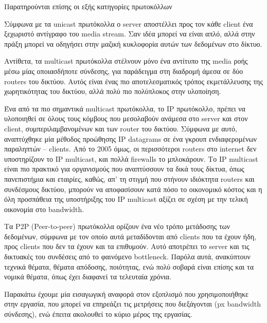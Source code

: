 \documentclass{article}
\begin{document}
Παρατηρούνται επίσης οι εξής κατηγορίες πρωτοκόλλων

Σύμφωνα με τα unicast πρωτόκολλα ο server αποστέλλει προς τον κάθε client ένα ξεχωριστό αντίγραφο του media stream.
Σαν ιδέα μπορεί να είναι απλό, αλλά στην πράξη μπορεί να οδηγήσει στην μαζική κυκλοφορία αυτών των δεδομένων στο δίκτυο.

Αντίθετα, τα multicast πρωτόκολλα στέλνουν μόνο ένα αντίτυπο της media ροής μέσω μίας οποιασδήποτε σύνδεσης, για παράδειγμα στη διαδρομή άμεσα σε δύο routers του δικτύου.
Αυτός είναι ένας πιο αποτελεσματικός τρόπος εκμετάλλευσης της χωρητικότητας του δικτύου, αλλά πολύ πιο πολύπλοκος στην υλοποίηση.

Ένα από τα πιο σημαντικά multicast πρωτόκολλα, το IP πρωτόκολλο, πρέπει να υλοποιηθεί σε όλους τους κόμβους που μεσολαβούν ανάμεσα στο server και στον client, συμπεριλαμβανομένων και των router του δικτύου.
Σύμφωνα με αυτό, αναπτύχθηκε μία μέθοδος προώθησης IP datagrams σε ένα γκρουπ ενδιαφερομένων παραληπτών – clients.
Από το 2005 όμως, οι περισσότεροι routers στο internet δεν υποστηρίζουν το IP multicast, και πολλά firewalls το μπλοκάρουν.
Το IP multicast είναι πιο πρακτικό για οργανισμούς που αναπτύσσουν τα δικά τους δίκτυα, όπως πανεπιστήμια και εταιρίες, καθώς, απ’ τη στιγμή που στήνουν ιδιόκτητα routers και συνδέσμους δικτύου, μπορούν να αποφασίσουν κατά πόσο το οικονομικό κόστος και η όλη προσπάθεια της υποστήριξης του IP multicast αξίζει σε σχέση με την τελική οικονομία στο bandwidth.

Τα P2P (Peer-to-peer) πρωτόκολλα ορίζουν ένα νέο τρόπο μετάδοσης των δεδομένων, σύμφωνα με τον οποίο αυτά μεταδίδονται από clients που τα έχουν ήδη, προς clients που δεν τα έχουν και τα επιθυμούν.
Αυτό αποτρέπει το server και τις δικτυακές του συνδέσεις από το φαινόμενο bottleneck.
Παρόλα αυτά, ανακύπτουν τεχνικά θέματα, θέματα απόδοσης, ποιότητας, ενώ πολύ σοβαρά είναι επίσης και τα νομικά θέματα, όπως έχει διαφανεί τα τελευταία χρόνια.

Παρακάτω έχουμε μία εισαγωγική αναφορά στον εξοπλισμό που χρησιμοποιήθηκε στην εργασία, που μπορεί να επηρεάζει τις μετρήσεις που διεξάγονται (px bandwidth σύνδεσης), ενώ έπειτα ακολουθεί το κύριο μέρος της εργασίας.
\end{document}
